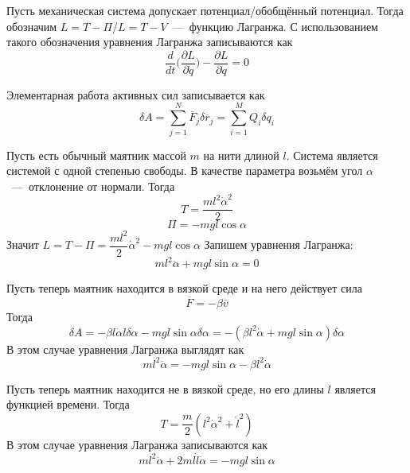 \begin{definition}
    Пусть механическая система допускает потенциал/обобщённый потенциал. Тогда обозначим $L = T - \Pi$/$L = T - V$~---~функцию Лагранжа. С использованием такого обозначения уравнения Лагранжа записываются как \[\dfrac{d}{dt}\biggr(\dfrac{\partial L}{\partial \dot{q}}\biggr) - \dfrac{\partial L}{\partial q} = 0\]
\end{definition}
\begin{note}
    Элементарная работа активных сил записывается как \[\delta A = \sum\limits_{j = 1}^N \overline{F}_j\delta \overline{r}_j = \sum\limits_{i = 1}^M Q_i \delta q_i\]
\end{note}
\begin{example}
    Пусть есть обычный маятник массой $m$ на нити длиной $l$. Система является системой с одной степенью свободы. В качестве параметра возьмём угол $\alpha$~---~отклонение от нормали. Тогда \[T = \dfrac{ml^2\dot{\alpha}^2}{2}\]
    \[ \Pi = -mgl\cos \alpha\]
    Значит $L = T - \Pi = \dfrac{ml^2}{2}\dot{\alpha}^2 - mgl\cos\alpha$
    Запишем уравнения Лагранжа: \[ml^2\ddot{\alpha} + mgl\sin\alpha = 0\]
\end{example}
\begin{example}
    Пусть теперь маятник находится в вязкой среде и на него действует сила \[\overline{F} = -\beta \overline{v}\]
    Тогда \[\delta A = -\beta l\dot{\alpha}l\delta \alpha - mgl\sin\alpha\delta \alpha = -(\beta l^2\dot{\alpha} + mgl\sin\alpha)\delta \alpha\]
    В этом случае уравнения Лагранжа выглядят как \[ml^2\ddot{\alpha} = -mgl\sin\alpha - \beta l^2\dot{\alpha}\]
\end{example}
\begin{example}
    Пусть теперь маятник находится не в вязкой среде, но его длины $l$ является функцией времени. Тогда \[T = \dfrac{m}{2}(l^2\dot{\alpha}^2 + \dot{l}^2)\]
    В этом случае уравнения Лагранжа записываются как \[ml^2\ddot{\alpha} + 2ml\dot{l}\dot{\alpha} = -mgl\sin\alpha\]
\end{example}
